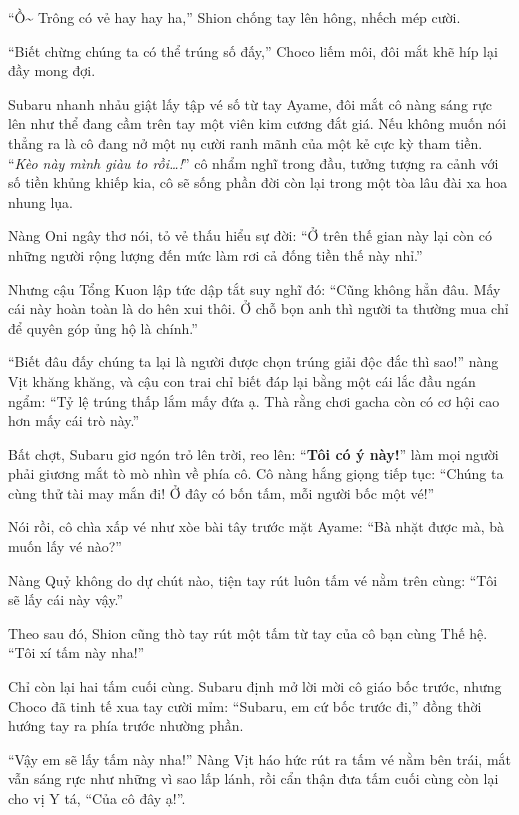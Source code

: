 \documentclass[../main.tex]{subfiles}
\begin{document}
\chrint

``Ồ\~{} Trông có vẻ hay hay ha,'' Shion chống tay lên hông, nhếch mép cười.

``Biết chừng chúng ta có thể trúng số đấy,'' Choco liếm môi, đôi mắt khẽ híp lại đầy mong đợi.

Subaru nhanh nhảu giật lấy tập vé số từ tay Ayame, đôi mắt cô nàng sáng rực lên như thể đang cầm trên tay một viên kim cương đắt giá. Nếu không muốn nói thẳng ra là cô đang nở một nụ cười ranh mãnh của một kẻ cực kỳ tham tiền. ``\textit{Kèo này mình giàu to rồi\dots!}'' cô nhẩm nghĩ trong đầu, tưởng tượng ra cảnh với số tiền khủng khiếp kia, cô sẽ sống phần đời còn lại trong một tòa lâu đài xa hoa nhung lụa.

Nàng Oni ngây thơ nói, tỏ vẻ thấu hiểu sự đời: ``Ở trên thế gian này lại còn có những người rộng lượng đến mức làm rơi cả đống tiền thế này nhỉ.''

Nhưng cậu Tổng Kuon lập tức dập tắt suy nghĩ đó: ``Cũng không hẳn đâu. Mấy cái này hoàn toàn là do hên xui thôi. Ở chỗ bọn anh thì người ta thường mua chỉ để quyên góp ủng hộ là chính.''

``Biết đâu đấy chúng ta lại là người được chọn trúng giải độc đắc thì sao!'' nàng Vịt khăng khăng, và cậu con trai chỉ biết đáp lại bằng một cái lắc đầu ngán ngẩm: ``Tỷ lệ trúng thấp lắm mấy đứa ạ. Thà rằng chơi gacha còn có cơ hội cao hơn mấy cái trò này.''

Bất chợt, Subaru giơ ngón trỏ lên trời, reo lên: ``\textbf{Tôi có ý này!}'' làm mọi người phải giương mắt tò mò nhìn về phía cô. Cô nàng hắng giọng tiếp tục: ``Chúng ta cùng thử tài may mắn đi! Ở đây có bốn tấm, mỗi người bốc một vé!''


Nói rồi, cô chìa xấp vé như xòe bài tây trước mặt Ayame: ``Bà nhặt được mà, bà muốn lấy vé nào?''

Nàng Quỷ không do dự chút nào, tiện tay rút luôn tấm vé nằm trên cùng: ``Tôi sẽ lấy cái này vậy.''

Theo sau đó, Shion cũng thò tay rút một tấm từ tay của cô bạn cùng Thế hệ. ``Tôi xí tấm này nha!''

Chỉ còn lại hai tấm cuối cùng. Subaru định mở lời mời cô giáo bốc trước, nhưng Choco đã tinh tế xua tay cười mỉm: ``Subaru, em cứ bốc trước đi,'' đồng thời hướng tay ra phía trước nhường phần.

``Vậy em sẽ lấy tấm này nha!'' Nàng Vịt háo hức rút ra tấm vé nằm bên trái, mắt vẫn sáng rực như những vì sao lấp lánh, rồi cẩn thận đưa tấm cuối cùng còn lại cho vị Y tá, ``Của cô đây ạ!''.
\end{document}

